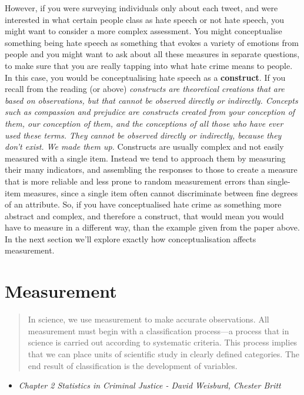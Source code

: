 \documentclass[
]{book}
\providecommand{\tightlist}{%
  \setlength{\itemsep}{0pt}\setlength{\parskip}{0pt}}
\begin{document}
However, if you were surveying individuals only about each tweet, and were interested in what certain people class as hate speech or not hate speech, you might want to consider a more complex assessment. You might conceptualise something being hate speech as something that evokes a variety of emotions from people and you might want to ask about all these measures in separate questions, to make sure that you are really tapping into what hate crime means to people. In this case, you would be conceptualising hate speech as a \textbf{construct}. If you recall from the reading (or above) \emph{constructs are theoretical creations that are based on observations, but that cannot be observed directly or indirectly. Concepts such as compassion and prejudice are constructs created from your conception of them, our conception of them, and the conceptions of all those who have ever used these terms. They cannot be observed directly or indirectly, because they don't exist. We made them up.} Constructs are usually complex and not easily measured with a single item. Instead we tend to approach them by measuring their many indicators, and assembling the responses to those to create a measure that is more reliable and less prone to random measurement errors than single-item measures, since a single item often cannot discriminate between fine degrees of an attribute. So, if you have conceptualised hate crime as something more abstract and complex, and therefore a construct, that would mean you would have to measure in a different way, than the example given from the paper above. In the next section we'll explore exactly how conceptualisation affects measurement.

\hypertarget{measurement}{%
\section{Measurement}\label{measurement}}

\begin{quote}
In science, we use measurement to make accurate observations. All measurement must begin with a classification process---a process that in science is carried out according to systematic criteria. This process implies that we can place units of scientific study in clearly defined categories. The end result of classification is the development of variables.
\end{quote}

\begin{itemize}
\tightlist
\item
  \emph{Chapter 2 Statistics in Criminal Justice - David Weisburd, Chester Britt}
\end{itemize}
\end{document}
